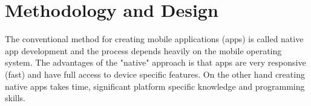 \documentclass[12pt,a4paper]{article}  %
\begin{document}






\section{Methodology and Design}

The conventional method for creating mobile applications (apps) is called native app development and the process depends heavily on the mobile operating system. The advantages of the "native" approach is that apps are very responsive (fast) and have full access to device specific features. On the other hand creating native apps takes time, significant platform specific knowledge and programming skills.
\end{document}
